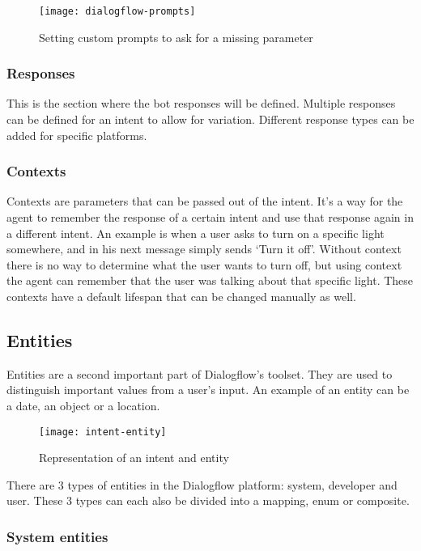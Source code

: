 \begin{figure}[ht]
	\centering
	\texttt{[image: dialogflow-prompts]}\label{fig:dialogflow-prompts}
	\caption{Setting custom prompts to ask for a missing parameter}
\end{figure}

\subsubsection{Responses}

This is the section where the bot responses will be defined. Multiple responses can be defined for an intent to allow for variation. Different response types can be added for specific platforms.

\subsubsection{Contexts}

Contexts are parameters that can be passed out of the intent. It's a way for the agent to remember the response of a certain intent and use that response again in a different intent. An example is when a user asks to turn on a specific light somewhere, and in his next message simply sends `Turn it off'. Without context there is no way to determine what the user wants to turn off, but using context the agent can remember that the user was talking about that specific light. These contexts have a default lifespan that can be changed manually as well.

\subsection{Entities}

Entities are a second important part of Dialogflow's toolset. They are used to distinguish important values from a user's input. An example of an entity can be a date, an object or a location.

\begin{figure}[ht]
	\centering
	\texttt{[image: intent-entity]}\label{fig:intent-entity}
	\caption{Representation of an intent and entity}
\end{figure}

There are 3 types of entities in the Dialogflow platform: system, developer and user. These 3 types can each also be divided into a mapping, enum or composite.

\subsubsection{System entities}

